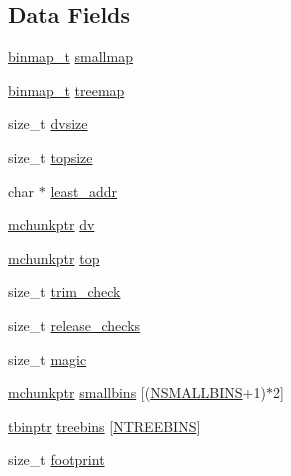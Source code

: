 \subsection*{Data Fields}
\begin{DoxyCompactItemize}
\item 
\hyperlink{dl__malloc_8c_a2714ff4b4994bc59cce3c3dce1e60c27}{binmap\+\_\+t} \hyperlink{structmalloc__state_a9e597125e4a96b39d3859c59fee38c49}{smallmap}
\item 
\hyperlink{dl__malloc_8c_a2714ff4b4994bc59cce3c3dce1e60c27}{binmap\+\_\+t} \hyperlink{structmalloc__state_ae20bf1bcda1838e5bc07d2395ba72283}{treemap}
\item 
size\+\_\+t \hyperlink{structmalloc__state_ae2e6a3ed8e8abaf03e47917057f1012d}{dvsize}
\item 
size\+\_\+t \hyperlink{structmalloc__state_aa93901fa8e414a7d7881ee968b097eea}{topsize}
\item 
char $\ast$ \hyperlink{structmalloc__state_af9a424730d25d685373ab736a29560b5}{least\+\_\+addr}
\item 
\hyperlink{dl__malloc_8c_aab2c188a259d6c4bd443ed712a92714c}{mchunkptr} \hyperlink{structmalloc__state_a840943ad4baaddbaaa5defe954ec06b9}{dv}
\item 
\hyperlink{dl__malloc_8c_aab2c188a259d6c4bd443ed712a92714c}{mchunkptr} \hyperlink{structmalloc__state_a594c4d03c189612e0ce91f7aba8dae77}{top}
\item 
size\+\_\+t \hyperlink{structmalloc__state_a30209a5277132d0f207c7a850d225324}{trim\+\_\+check}
\item 
size\+\_\+t \hyperlink{structmalloc__state_af2afbe4faf64185994d9c10cef2e0a3a}{release\+\_\+checks}
\item 
size\+\_\+t \hyperlink{structmalloc__state_ac19e13bf018dc22419c38d8cbe839b62}{magic}
\item 
\hyperlink{dl__malloc_8c_aab2c188a259d6c4bd443ed712a92714c}{mchunkptr} \hyperlink{structmalloc__state_ade50b83b94e4f09d372a18ae51c13f70}{smallbins} \mbox{[}(\hyperlink{dl__malloc_8c_afe898942dfe9b3557981d0dc935fddde}{N\+S\+M\+A\+L\+L\+B\+I\+NS}+1)$\ast$2\mbox{]}
\item 
\hyperlink{dl__malloc_8c_a1a975f80818075b2e6dc1e778144d14a}{tbinptr} \hyperlink{structmalloc__state_a7ccf88dffa5e3287b7c9dd290ea1a0cb}{treebins} \mbox{[}\hyperlink{dl__malloc_8c_a187fe34f71c63b486f6d79ac51117061}{N\+T\+R\+E\+E\+B\+I\+NS}\mbox{]}
\item 
size\+\_\+t \hyperlink{structmalloc__state_a77ec93dc40bb85bd7a3c4e9b26547d11}{footprint}
\item 

\end{DoxyCompactItemize}
